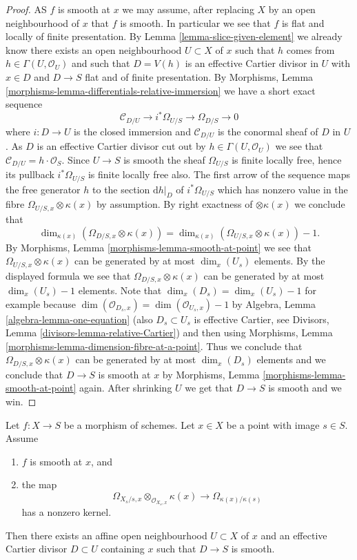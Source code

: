 \begin{proof}
AS $f$ is smooth at $x$ we may assume, after replacing $X$ by an open
neighbourhood of $x$ that $f$ is smooth. In particular we see that
$f$ is flat and locally of finite presentation. By
Lemma \ref{lemma-slice-given-element}
we already know there exists an open neighbourhood $U \subset X$ of $x$
such that $h$ comes from $h \in \Gamma(U, \mathcal{O}_U)$ and such
that $D = V(h)$ is an effective Cartier divisor in $U$ with $x \in D$ and
$D \to S$ flat and of finite presentation. By
Morphisms, Lemma \ref{morphisms-lemma-differentials-relative-immersion}
we have a short exact sequence
$$
\mathcal{C}_{D/U} \to i^*\Omega_{U/S} \to \Omega_{D/S} \to 0
$$
where $i : D \to U$ is the closed immersion and $\mathcal{C}_{D/U}$
is the conormal sheaf of $D$ in $U$. As $D$ is an effective Cartier
divisor cut out by $h \in \Gamma(U, \mathcal{O}_U)$ we see that
$\mathcal{C}_{D/U} = h \cdot \mathcal{O}_S$. Since $U \to S$ is smooth
the sheaf $\Omega_{U/S}$ is finite locally free, hence its pullback
$i^*\Omega_{U/S}$ is finite locally free also. The first arrow of
the sequence maps the free generator $h$ to the section $\text{d}h|_D$
of $i^*\Omega_{U/S}$ which has nonzero value in the fibre
$\Omega_{U/S, x} \otimes \kappa(x)$ by assumption. By right exactness
of $\otimes \kappa(x)$ we conclude that
$$
\dim_{\kappa(x)} \left( \Omega_{D/S, x} \otimes \kappa(x) \right)
=
\dim_{\kappa(x)} \left( \Omega_{U/S, x} \otimes \kappa(x) \right) - 1.
$$
By
Morphisms, Lemma \ref{morphisms-lemma-smooth-at-point}
we see that $\Omega_{U/S, x} \otimes \kappa(x)$ can be generated by
at most $\dim_x(U_s)$ elements. By the displayed formula we see that
$\Omega_{D/S, x} \otimes \kappa(x)$ can be generated by at most
$\dim_x(U_s) - 1$ elements. Note that
$\dim_x(D_s) = \dim_x(U_s) - 1$ for example because
$\dim(\mathcal{O}_{D_s, x}) = \dim(\mathcal{O}_{U_s, x}) - 1$ by
Algebra, Lemma \ref{algebra-lemma-one-equation}
(also $D_s \subset U_s$ is effective Cartier, see
Divisors, Lemma \ref{divisors-lemma-relative-Cartier})
and then using
Morphisms, Lemma \ref{morphisms-lemma-dimension-fibre-at-a-point}.
Thus we conclude that $\Omega_{D/S, x} \otimes \kappa(x)$ can be generated
by at most $\dim_x(D_s)$ elements and we conclude that $D \to S$
is smooth at $x$ by
Morphisms, Lemma \ref{morphisms-lemma-smooth-at-point}
again. After shrinking $U$ we get that $D \to S$ is smooth and we win.
\end{proof}

\begin{lemma}
\label{lemma-slice-smooth-once}
Let $f : X \to S$ be a morphism of schemes.
Let $x \in X$ be a point with image $s \in S$.
Assume
\begin{enumerate}
\item $f$ is smooth at $x$, and
\item the map
$$
\Omega_{X_s/s, x} \otimes_{\mathcal{O}_{X_s, x}} \kappa(x)
\longrightarrow
\Omega_{\kappa(x)/\kappa(s)}
$$
has a nonzero kernel.
\end{enumerate}
Then there exists an affine open neighbourhood $U \subset X$ of $x$
and an effective Cartier divisor $D \subset U$ containing $x$ such that
$D \to S$ is smooth.
\end{lemma}

